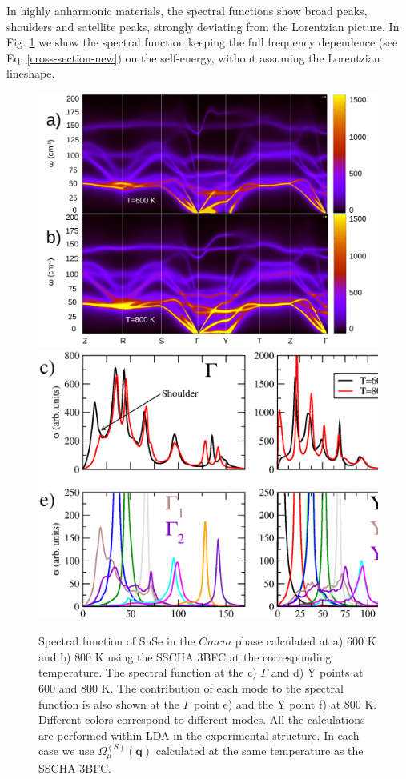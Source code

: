 In highly anharmonic materials\cite{ribeiro2018strong,li2014phonon,bianco2018high,delaire2011giant,paulatto2015first}, the spectral functions show broad peaks, shoulders and satellite peaks, strongly deviating from the Lorentzian 
picture. In Fig. \ref{spectral-snse} we show the spectral function keeping the full frequency dependence (see Eq. \ref{cross-section-new}) on the self-energy, without assuming the Lorentzian lineshape.
\begin{figure}[h]
\begin{center}
\includegraphics[width=0.80\linewidth]{Figures/full-ins-snse.pdf}
\includegraphics[width=0.80\linewidth]{Figures/ins-snse.eps}
\caption[Nonperturbative spectral function in SnSe.]{Spectral function of SnSe in the $Cmcm$ phase calculated at a) $600$ K and b) $800$ K using the SSCHA 3BFC at the corresponding temperature. The spectral function at the c) $\Gamma$ 
and d) Y points at $600$ and $800$ K. The contribution of each mode to the spectral function is also shown at the $\Gamma$ point e) and the Y point f) at $800$ K. Different colors correspond to different modes. All the calculations are 
performed within LDA in the experimental structure. In each case we use $\Omega^{(S)}_{\mu}(\mathbf{q})$ calculated 
at the same temperature as the SSCHA 3BFC.}
\label{spectral-snse}
\end{center}
\end{figure}
